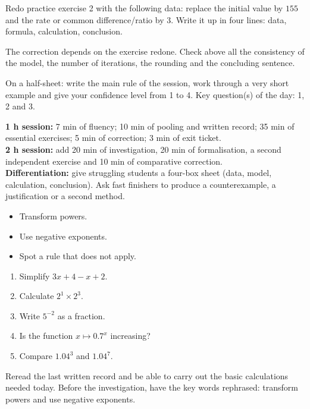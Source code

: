 
\begin{homework}Redo practice exercise 2 with the following data: replace the initial value by $155$ and the rate or common difference/ratio by $3$. Write it up in four lines: data, formula, calculation, conclusion.\end{homework}
\begin{solution}The correction depends on the exercise redone. Check above all the consistency of the model, the number of iterations, the rounding and the concluding sentence.\end{solution}

\begin{exitticket}[3 minutes]On a half-sheet: write the main rule of the session, work through a very short example and give your confidence level from 1 to 4. Key question(s) of the day: 1, 2 and 3.\end{exitticket}

\ifmxteacher
\begin{method}
\textbf{1 h session:} 7 min of fluency; 10 min of pooling and written record; 35 min of essential exercises; 5 min of correction; 3 min of exit ticket.\\
\textbf{2 h session:} add 20 min of investigation, 20 min of formalisation, a second independent exercise and 10 min of comparative correction.\\
\textbf{Differentiation:} give struggling students a four-box sheet (data, model, calculation, conclusion). Ask fast finishers to produce a counterexample, a justification or a second method.
\end{method}
\fi
{}
\begin{objectives}\begin{itemize}\item Transform powers.\item Use negative exponents.\item Spot a rule that does not apply.\end{itemize}\end{objectives}
\begin{fluency}\begin{enumerate}\item Simplify $3x+4-x+2$. \item Calculate $2^1\times2^3$. \item Write $5^{-2}$ as a fraction. \item Is the function $x\mapsto\num{0,7}^x$ increasing? \item Compare $\num{1,04}^3$ and $\num{1,04}^7$. \end{enumerate}\end{fluency}
\begin{prerequisites}Reread the last written record and be able to carry out the basic calculations needed today. Before the investigation, have the key words rephrased: transform powers and use negative exponents.\end{prerequisites}

